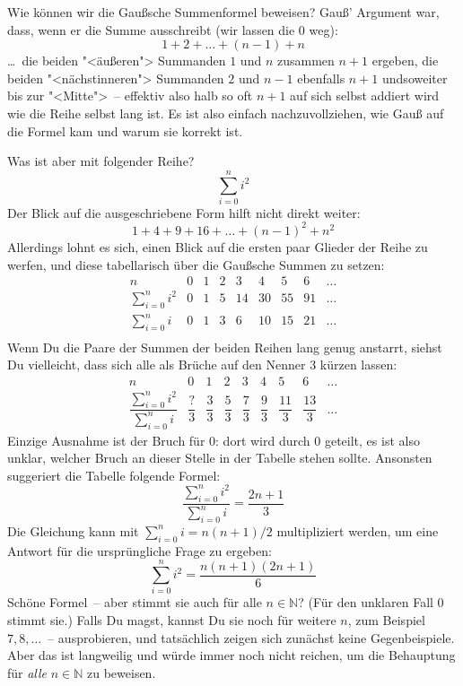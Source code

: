 Wie können wir die Gaußsche Summenformel beweisen?  Gauß' Argument war, dass,
wenn er die Summe ausschreibt (wir lassen die 0 weg):
%
\[ 1+2+\ldots+(n-1) + n \]
%
\ldots~die beiden "<äußeren"> Summanden $1$ und $n$ zusammen $n+1$
ergeben, die beiden "<nächstinneren"> Summanden $2$ und $n-1$
ebenfalls $n+1$ undsoweiter bis zur "<Mitte">~-- effektiv also halb so
oft $n+1$ auf sich selbst addiert wird wie die Reihe selbst lang ist.
Es ist also einfach nachzuvollziehen, wie Gauß auf die Formel kam und
warum sie korrekt ist.

Was ist aber mit folgender Reihe?
%
\[ \sum_{i=0}^n i^2 \]
%
Der Blick auf die ausgeschriebene Form hilft nicht direkt weiter:
%
\[ 1+4+9+16+\ldots+(n-1)^2+n^2 \]
%
Allerdings lohnt es sich, einen Blick auf die ersten paar Glieder der
Reihe zu werfen, und diese tabellarisch über die Gaußsche Summen zu
setzen:
%
\begin{displaymath}
  \begin{array}{crrrrrrrr}
    n & 0 & 1 & 2 & 3 & 4 & 5 & 6 & \ldots\\\hline
    \sum_{i=0}^n i^2 & 0 & 1 & 5 & 14 & 30 & 55 & 91 & \ldots\\
    \sum_{i=0}^n i   & 0 & 1 & 3 & 6 & 10 & 15 & 21 & \ldots\\
  \end{array}
\end{displaymath}
%
Wenn Du die Paare der Summen der beiden Reihen lang genug anstarrt, siehst
Du vielleicht, dass sich alle als Brüche auf den Nenner 3 kürzen lassen:
%
\begin{displaymath}
  \begin{array}{crrrrrrrr}
    n & 0 & 1 & 2 & 3 & 4 & 5 & 6 & \ldots\\\hline
    \dfrac{\sum_{i=0}^n i^2}{\sum_{i=0}^n i} & \dfrac{?}{3} & \dfrac{3}{3} &
    \dfrac{5}{3} & \dfrac{7}{3} & \dfrac{9}{3} & \dfrac{11}{3} & \dfrac{13}{3} & \ldots
  \end{array}
\end{displaymath}
%
Einzige Ausnahme ist der Bruch für $0$: dort wird durch $0$ geteilt, es
ist also unklar, welcher Bruch an dieser Stelle in der Tabelle stehen
sollte.  Ansonsten suggeriert die Tabelle folgende Formel:
%
\begin{displaymath}
  \dfrac{\sum_{i=0}^n i^2}{\sum_{i=0}^n i} = \dfrac{2n+1}{3}
\end{displaymath}
%
Die Gleichung kann mit $\sum_{i=0}^n i = n(n+1)/2$ multipliziert werden, um eine
Antwort für die ursprüngliche Frage zu ergeben:
%
\begin{equation}
  \sum_{i=0}^n i^2 = \dfrac{n(n+1)(2n+1)}{6}
  \label{eq:squares-induction-prequel}
\end{equation}
%
Schöne Formel~-- aber stimmt sie auch für alle $n\in\mathbb{N}$?  (Für
den unklaren Fall $0$ stimmt sie.)  Falls Du
magst, kannst Du sie noch für weitere $n$, zum Beispiel $7, 8, \ldots$~-- ausprobieren,
und tatsächlich zeigen sich zunächst keine Gegenbeispiele.  Aber das
ist langweilig und würde immer noch nicht reichen, um die Behauptung
für \emph{alle} $n\in\mathbb{N}$ zu beweisen.

